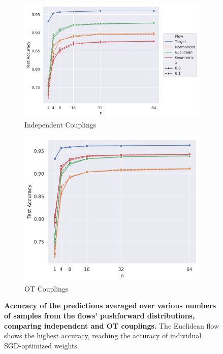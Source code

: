 \begin{figure}[t!]
    \centering
    \begin{subfigure}{0.55\linewidth}
        \centering
        \includegraphics[width=\linewidth]{figures/mnist/mnist_model_averaging.png}
        \caption{Independent Couplings}
    \end{subfigure}
    \begin{subfigure}{0.43\linewidth}
        \centering
        \includegraphics[width=\linewidth]{figures/mnist/mnist_model_averaging_OT.png}
        \caption{OT Couplings}
    \end{subfigure}
    \caption{\label{fig:mnist_averaging}\textbf{Accuracy of the predictions averaged over various numbers of samples from the flows' pushforward distributions, comparing independent and OT couplings.} The Euclidean flow shows the highest accuracy, reaching the accuracy of individual SGD-optimized weights.} 
\end{figure}

